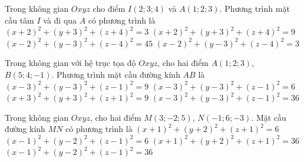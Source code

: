 \begin{ex}%
	Trong không gian $Oxyz$ cho điểm $I(2;3;4)$ và $A(1;2;3)$. Phương trình mặt cầu tâm $I$ và đi qua $A$ có phương trình là
	\choice
	{$(x+2)^2+(y+3)^2+(z+4)^2=3$}
	{$(x+2)^2+(y+3)^2+(z+4)^2=9$}
	{$(x-2)^2+(y-3)^2+(z-4)^2=45$}
	{\True $(x-2)^2+(y-3)^2+(z-4)^2=3$}
\end{ex}

\begin{ex}%
	Trong không gian với hệ trục tọa độ $Oxyz$, cho hai điểm $A(1;2;3)$, $B(5;4;-1)$. Phương trình mặt cầu đường kính $AB$ là
	\choice
	{\True $(x-3)^2+(y-3)^2+(z-1)^2=9$}
	{$(x-3)^2+(y-3)^2+(z-1)^2=6$}
	{$(x+3)^2+(y+3)^2+(z+1)^2=9$}
	{$(x-3)^2+(y-3)^2+(z-1)^2=36$}
\end{ex}

\begin{ex}%
	Trong không gian $Oxyz$, cho hai điểm $M(3;-2;5)$, $N(-1;6;-3)$. Mặt cầu đường kính $MN$ có phương trình là
	\choice
	{$(x+1)^2+(y+2)^2+(z+1)^2=6$}
	{$(x-1)^2+(y-2)^2+(z-1)^2=6$}
	{$(x+1)^2+(y+2)^2+(z+1)^2=36$}
	{\True $(x-1)^2+(y-2)^2+(z-1)^2=36$}
\end{ex}

